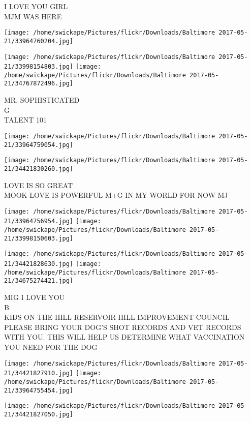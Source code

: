 \documentclass[10pt,letterpaper]{article}
\begin{document}
I LOVE YOU GIRL\\
MJM WAS HERE
\pagebreak

\texttt{[image: /home/swickape/Pictures/flickr/Downloads/Baltimore 2017-05-21/33964760204.jpg]}

\vspace{0.25in}
\texttt{[image: /home/swickape/Pictures/flickr/Downloads/Baltimore 2017-05-21/33998154803.jpg]}
\texttt{[image: /home/swickape/Pictures/flickr/Downloads/Baltimore 2017-05-21/34767872496.jpg]}

MR. SOPHISTICATED\\
G\\
TALENT 101
\pagebreak

\texttt{[image: /home/swickape/Pictures/flickr/Downloads/Baltimore 2017-05-21/33964759054.jpg]}

\vspace{0.25in}
\texttt{[image: /home/swickape/Pictures/flickr/Downloads/Baltimore 2017-05-21/34421830260.jpg]}

LOVE IS SO GREAT\\
MOOK LOVE IS POWERFUL M+G IN MY WORLD FOR NOW MJ
\pagebreak

\texttt{[image: /home/swickape/Pictures/flickr/Downloads/Baltimore 2017-05-21/33964756954.jpg]}
\texttt{[image: /home/swickape/Pictures/flickr/Downloads/Baltimore 2017-05-21/33998150603.jpg]}

\texttt{[image: /home/swickape/Pictures/flickr/Downloads/Baltimore 2017-05-21/34421828630.jpg]}
\texttt{[image: /home/swickape/Pictures/flickr/Downloads/Baltimore 2017-05-21/34675274421.jpg]}

MIG I LOVE YOU\\
B\\
KIDS ON THE HILL RESERVOIR HILL IMPROVEMENT COUNCIL\\
PLEASE BRING YOUR DOG'S SHOT RECORDS AND VET RECORDS WITH YOU.  THIS WILL HELP US DETERMINE WHAT VACCINATION YOU NEED FOR THE DOG
\pagebreak

\texttt{[image: /home/swickape/Pictures/flickr/Downloads/Baltimore 2017-05-21/34421827910.jpg]}
\texttt{[image: /home/swickape/Pictures/flickr/Downloads/Baltimore 2017-05-21/33964755454.jpg]}

\texttt{[image: /home/swickape/Pictures/flickr/Downloads/Baltimore 2017-05-21/34421827050.jpg]}
\end{document}
